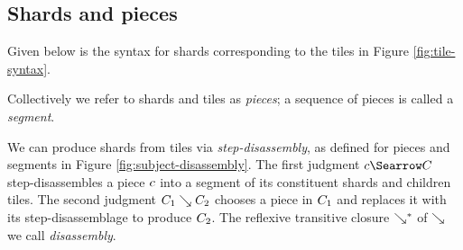 

\subsection{Shards and pieces} \label{sec:shards-and-pieces}

Given below is the syntax for shards corresponding to the tiles
in Figure \ref{fig:tile-syntax}.


\noindent {}
Collectively we refer to shards and tiles as \emph{pieces};
a sequence of pieces is called a \emph{segment}.





We can produce shards from tiles via \emph{step-disassembly},
as defined for pieces and segments in Figure \ref{fig:subject-disassembly}.
The first judgment $\pieceDisassembles{\selem}{\selection}$
step-disassembles a piece $c$ into a segment of
its constituent shards and children tiles.
The second judgment $C_1 \searrow C_2$
chooses a piece in $C_1$ and replaces it with its
step-disassemblage to produce $C_2$.
The reflexive transitive closure $\searrow^*$ of
$\searrow$ we call \emph{disassembly}.

